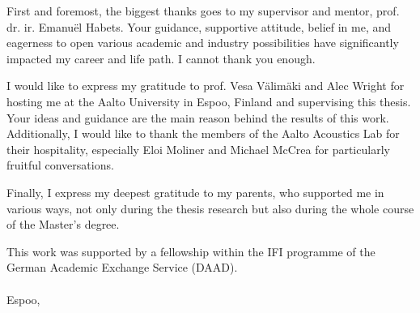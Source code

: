 First and foremost, the biggest thanks goes to my supervisor and mentor, prof. dr. ir. Emanu{\"e}l Habets. Your guidance, supportive attitude, belief in me, and eagerness to open various academic and industry possibilities have significantly impacted my career and life path. I cannot thank you enough.

I would like to express my gratitude to prof. Vesa V{\"a}lim{\"a}ki and Alec Wright for hosting me at the Aalto University in Espoo, Finland and supervising this thesis. Your ideas and guidance are the main reason behind the results of this work. Additionally, I would like to thank the members of the Aalto Acoustics Lab for their hospitality, especially Eloi Moliner and Michael McCrea for particularly fruitful conversations.

Finally, I express my deepest gratitude to my parents, who supported me in various ways, not only during the thesis research but also during the whole course of the Master's degree.

This work was supported by a
fellowship within the IFI programme of the German Academic Exchange
Service (DAAD).
\\
\\

Espoo, \myTime \\
\begin{flushright}
    \myName
\end{flushright}


\clearpage